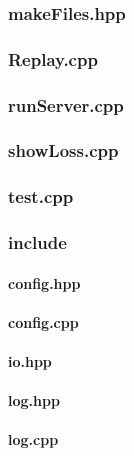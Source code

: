 \documentclass[12pt]{article}
\newcommand{\incFile}[2]{\label{code:#2}}
\begin{document}
\subsubsection{makeFiles.hpp}										\incFile{C++}{AlphaZeroPytorch/makeFiles.hpp}
\subsubsection{Replay.cpp}											\incFile{C++}{AlphaZeroPytorch/Replay.cpp}
\subsubsection{runServer.cpp}										\incFile{C++}{AlphaZeroPytorch/runServer.cpp}
\subsubsection{showLoss.cpp}										\incFile{C++}{AlphaZeroPytorch/showLoss.cpp}
\subsubsection{test.cpp}												\incFile{C++}{AlphaZeroPytorch/test.cpp}
\subsubsection{include}													%
\paragraph{config.hpp}													\incFile{C++}{AlphaZeroPytorch/include/config.hpp} \label{code:config}
\paragraph{config.cpp}													\incFile{C++}{AlphaZeroPytorch/include/config.cpp}
\paragraph{io.hpp}															\incFile{C++}{AlphaZeroPytorch/include/io.hpp}
\paragraph{log.hpp}														\incFile{C++}{AlphaZeroPytorch/include/log.hpp}
\paragraph{log.cpp}														\incFile{C++}{AlphaZeroPytorch/include/log.cpp}
\end{document}
